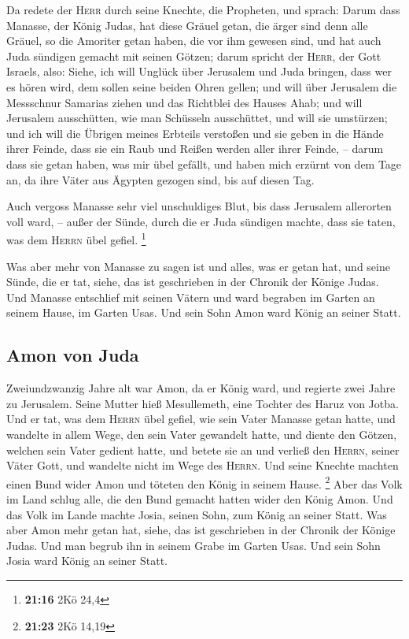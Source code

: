  Da redete der \textsc{Herr} durch seine Knechte, die
Propheten, und sprach:  Darum dass Manasse, der König
Judas, hat diese Gräuel getan, die ärger sind denn alle Gräuel, so die
Amoriter getan haben, die vor ihm gewesen sind, und hat auch Juda
sündigen gemacht mit seinen Götzen;  darum spricht der
\textsc{Herr}, der Gott Israels, also: Siehe, ich will Unglück über
Jerusalem und Juda bringen, dass wer es hören wird, dem sollen seine
beiden Ohren gellen;  und will über Jerusalem die
Messschnur Samarias ziehen und das Richtblei des Hauses Ahab; und will
Jerusalem ausschütten, wie man Schüsseln ausschüttet, und will sie
umstürzen;  und ich will die Übrigen meines Erbteils
verstoßen und sie geben in die Hände ihrer Feinde, dass sie ein Raub und
Reißen werden aller ihrer Feinde, --  darum dass sie
getan haben, was mir übel gefällt, und haben mich erzürnt von dem Tage
an, da ihre Väter aus Ägypten gezogen sind, bis auf diesen Tag.

 Auch vergoss Manasse sehr viel unschuldiges Blut, bis
dass Jerusalem allerorten voll ward, -- außer der Sünde, durch die er
Juda sündigen machte, dass sie taten, was dem \textsc{Herrn} übel
gefiel. \footnote{\textbf{21:16} 2Kö 24,4}

 Was aber mehr von Manasse zu sagen ist und alles, was er
getan hat, und seine Sünde, die er tat, siehe, das ist geschrieben in
der Chronik der Könige Judas.  Und Manasse entschlief mit
seinen Vätern und ward begraben im Garten an seinem Hause, im Garten
Usas. Und sein Sohn Amon ward König an seiner Statt.

\hypertarget{amon-von-juda}{%
\subsection{Amon von Juda}\label{amon-von-juda}}

 Zweiundzwanzig Jahre alt war Amon, da er König ward, und
regierte zwei Jahre zu Jerusalem. Seine Mutter hieß Mesullemeth, eine
Tochter des Haruz von Jotba.  Und er tat, was dem
\textsc{Herrn} übel gefiel, wie sein Vater Manasse getan hatte,
 und wandelte in allem Wege, den sein Vater gewandelt
hatte, und diente den Götzen, welchen sein Vater gedient hatte, und
betete sie an  und verließ den \textsc{Herrn}, seiner
Väter Gott, und wandelte nicht im Wege des \textsc{Herrn}.
 Und seine Knechte machten einen Bund wider Amon und
töteten den König in seinem Hause. \footnote{\textbf{21:23} 2Kö 14,19}
 Aber das Volk im Land schlug alle, die den Bund gemacht
hatten wider den König Amon. Und das Volk im Lande machte Josia, seinen
Sohn, zum König an seiner Statt.  Was aber Amon mehr
getan hat, siehe, das ist geschrieben in der Chronik der Könige Judas.
 Und man begrub ihn in seinem Grabe im Garten Usas. Und
sein Sohn Josia ward König an seiner Statt.

